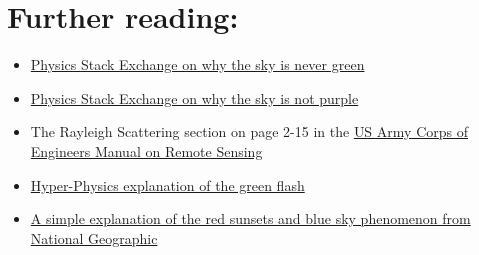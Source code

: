 \documentclass[12pt]{article}
\begin{document}
\section{Further reading:}\label{further-reading}

\begin{itemize}
\item
  \href{http://physics.stackexchange.com/a/137217}{Physics Stack
  Exchange on why the sky is never green}
\item
  \href{http://physics.stackexchange.com/a/28903}{Physics Stack Exchange
  on why the sky is not purple}
\item
  The Rayleigh Scattering section on page 2-15 in the
  \href{\%7B\%7B\%20site.url\%20\%7D\%7Dblog/resources/Remote-Sensing-Army-Manual.pdf}{US
  Army Corps of Engineers Manual on Remote Sensing}
\item
  \href{http://hyperphysics.phy-astr.gsu.edu/hbase/atmos/redsun.html}{Hyper-Physics
  explanation of the green flash}
\item
  \href{http://news.nationalgeographic.com/news/2013/10/131027-sunset-sky-change-color-red-clouds-science/}{A
  simple explanation of the red sunsets and blue sky phenomenon from
  National Geographic}
\end{itemize}
\end{document}
